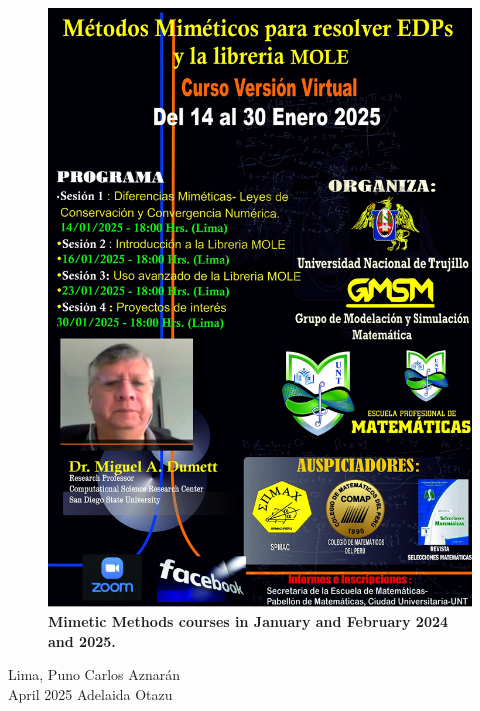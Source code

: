 \begin{figure}[ht!]
	\includegraphics[width=.32\paperwidth]{mole2025}
	\caption*{\bfseries Mimetic Methods courses in January and February 2024 and 2025.}
\end{figure}

\begin{flushright}
	Lima, Puno \hfill Carlos Aznarán \\[.5\baselineskip]

	April 2025 \hfill Adelaida Otazu
\end{flushright}
